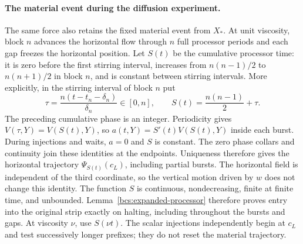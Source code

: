 \paragraph{The material event during the diffusion experiment.}
The same force also retains the fixed material event from $X_*$. At unit viscosity, block $n$ advances the horizontal flow through $n$ full processor periods and each gap freezes the horizontal position. Let $S(t)$ be the cumulative processor time: it is zero before the first stirring interval, increases from $n(n-1)/2$ to $n(n+1)/2$ in block $n$, and is constant between stirring intervals. More explicitly, in the stirring interval of block $n$ put
\[
 \tau=\frac{n(t-t_n-\delta_n)}{\delta_n}\in[0,n],\qquad
 S(t)=\frac{n(n-1)}2+\tau.
\]
The preceding cumulative phase is an integer. Periodicity gives $V(\tau,Y)=V(S(t),Y)$, so $a(t,Y)=S'(t)V(S(t),Y)$ inside each burst. During injections and waits, $a=0$ and $S$ is constant. The zero phase collars and continuity join these identities at the endpoints. Uniqueness therefore gives the horizontal trajectory $\Psi_{S(t)}(c_L)$, including partial bursts. The horizontal field is independent of the third coordinate, so the vertical motion driven by $w$ does not change this identity. The function $S$ is continuous, nondecreasing, finite at finite time, and unbounded. Lemma~\ref{bcs:expanded-processor} therefore proves entry into the original strip exactly on halting, including throughout the bursts and gaps. At viscosity $\nu$, use $S(\nu t)$. The scalar injections independently begin at $c_L$ and test successively longer prefixes; they do not reset the material trajectory.
